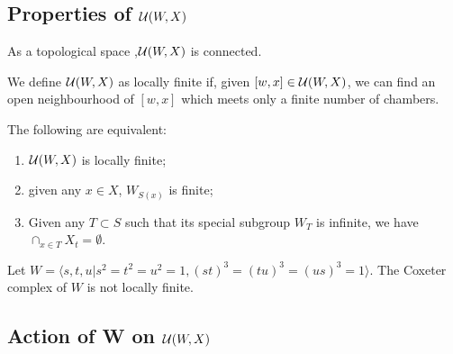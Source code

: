 \documentclass[12pt]{article}
\begin{document}
\subsection{Properties of $\mathcal{U}(W,X)$}
\begin{lemma}
    As a topological space ,$\mathcal{U}(W,X)$ is connected.
\end{lemma}

\begin{definition}
    We define  $\mathcal{U}(W,X)$ as locally finite if, given $[w,x]\in\mathcal{U}(W,X)$, we can find an open neighbourhood of $[w,x]$ which meets only a finite number of chambers.
\end{definition}

\begin{lemma}
    The following are equivalent:
    \begin{enumerate}
        \item $\mathcal{U}(W,X)$ is locally finite;
        \item given any $x\in X$, $W_{S(x)}$ is finite;
        \item Given any $T\subset S$ such that its special subgroup $W_T$ is infinite, we have $\cap_{x\in T}X_t=\emptyset.$
    \end{enumerate}
\end{lemma}

\begin{example}
    Let $W=\langle s,t,u|s^2=t^2=u^2=1,(st)^3=(tu)^3=(us)^3=1\rangle$. The Coxeter complex of $W$ is not locally finite. 
\end{example}


\subsection{Action of W on $\mathcal{U}(W,X)$}
\end{document}
